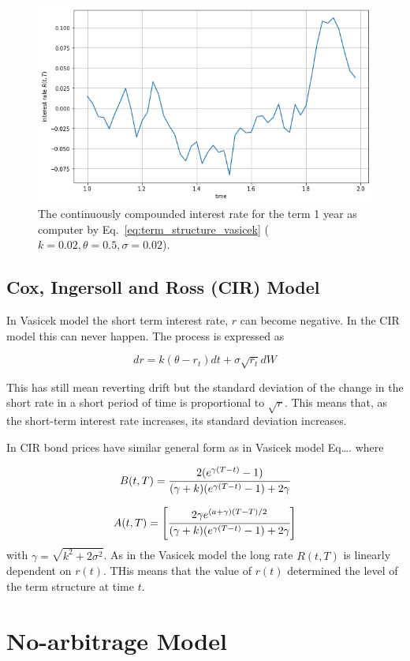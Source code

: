 \begin{figure}[htb]
	\centering
	\includegraphics[width=0.7\linewidth]{figures/vasicek_interest_rate}
	\caption{The continuously compounded interest rate for the term 1 year as computer by Eq.~\ref{eq:term_structure_vasicek} ($k=0.02, \theta=0.5, \sigma=0.02$).}
	\label{fig:term_structure_vasicek}
\end{figure}

\subsection{Cox, Ingersoll and Ross (CIR) Model}
\label{cox-ingersoll-and-ross-cir-model}

In Vasicek model the short term interest rate, \(r\) can become
negative. In the CIR model this can never happen. The process is
expressed as

\[dr = k(\theta - r_t)dt + \sigma\sqrt{r_t}dW\]

This has still mean reverting drift but the standard deviation of the
change in the short rate in a short period of time is proportional to
\(\sqrt{r}\). This means that, as the short-term interest rate
increases, its standard deviation increases.

In CIR bond prices have similar general form as in Vasicek model
Eq\ldots{}. where

\[B(t, T) = \cfrac{2(e^{\gamma(T-t)}-1)}{(\gamma+k)(e^{\gamma(T-t)}-1)+2\gamma}\]

\[A(t, T) = \left[\cfrac{2\gamma e^{(a+\gamma)(T-T)/2}}{(\gamma+k)(e^{\gamma(T-t)}-1)+2\gamma}\right]\]
with \(\gamma = \sqrt {k^2 + 2\sigma^2}\). As in the Vasicek model the
long rate \(R(t, T)\) is linearly dependent on \(r(t)\). THis means that
the value of \(r(t)\) determined the level of the term structure at time
\(t\).

\section{No-arbitrage Model}
\label{no-arbitrage-model}

